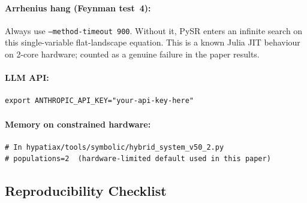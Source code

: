 \documentclass[twoside,11pt]{article}
\begin{document}
\paragraph{Arrhenius hang (Feynman test~4):}
Always use \texttt{--method-timeout 900}. Without it, PySR enters an
infinite search on this single-variable flat-landscape equation.
This is a known Julia JIT behaviour on 2-core hardware; counted as a
genuine failure in the paper results.

\paragraph{LLM API:}
\begin{small}
\begin{verbatim}
export ANTHROPIC_API_KEY="your-api-key-here"
\end{verbatim}
\end{small}

\paragraph{Memory on constrained hardware:}
\begin{small}
\begin{verbatim}
# In hypatiax/tools/symbolic/hybrid_system_v50_2.py
# populations=2  (hardware-limited default used in this paper)
\end{verbatim}
\end{small}

\subsection{Reproducibility Checklist}
\end{document}

